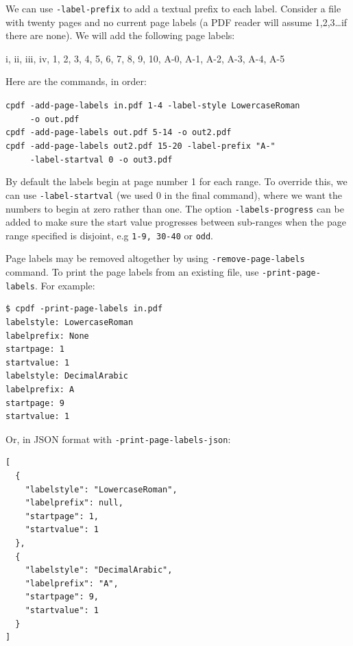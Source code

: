 \documentclass{book}
\begin{document}
\noindent We can use \texttt{-label-prefix} to add a textual prefix to each label. 
Consider a file with twenty pages and no current page labels (a PDF reader will assume 1,2,3\ldots if there are none). We will add the following page labels:

\vspace{4mm}
i, ii, iii, iv, 1, 2, 3, 4, 5, 6, 7, 8, 9, 10, A-0, A-1, A-2, A-3, A-4, A-5
\vspace{4mm}

\noindent Here are the commands, in order:

{\small\begin{framed}
  \noindent\verb!cpdf -add-page-labels in.pdf 1-4 -label-style LowercaseRoman!\\
  \noindent\verb!     -o out.pdf!\\
  
  \noindent\verb!cpdf -add-page-labels out.pdf 5-14 -o out2.pdf!\\

  \noindent\verb!cpdf -add-page-labels out2.pdf 15-20 -label-prefix "A-"!\\
  \noindent\verb!     -label-startval 0 -o out3.pdf!
\end{framed}}

\noindent By default the labels begin at page number 1 for each range. To override this, we can use \texttt{-label-startval} (we used $0$ in the final command), where we want the numbers to begin at zero rather than one. The option \texttt{-labels-progress} can be added to make sure the  start value progresses between sub-ranges when the page range specified is disjoint, e.g \texttt{1-9, 30-40} or \texttt{odd}.

Page labels may be removed altogether by using \texttt{-remove-page-labels} command. To print the page labels from an existing file, use \texttt{-print-page-labels}. For example:
\begin{framed}\small\begin{verbatim}$ cpdf -print-page-labels in.pdf
labelstyle: LowercaseRoman
labelprefix: None
startpage: 1
startvalue: 1
labelstyle: DecimalArabic
labelprefix: A
startpage: 9
startvalue: 1
\end{verbatim}
\end{framed}\pagestyle{empty}\thispagestyle{fancy}

\noindent Or, in JSON format with \texttt{-print-page-labels-json}:

\begin{framed}\small\begin{verbatim}[
  {
    "labelstyle": "LowercaseRoman",
    "labelprefix": null,
    "startpage": 1,
    "startvalue": 1
  },
  {
    "labelstyle": "DecimalArabic",
    "labelprefix": "A",
    "startpage": 9,
    "startvalue": 1
  }
]
\end{verbatim}
\end{framed}\pagestyle{empty}
\end{document}
